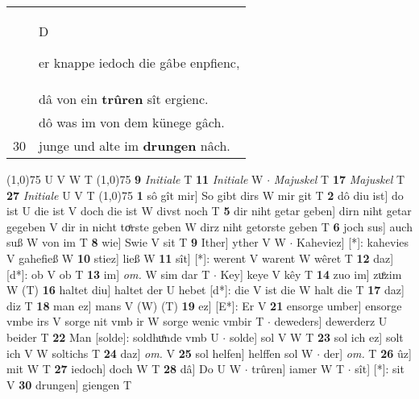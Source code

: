 \documentclass[8pt,a4paper,notitlepage]{article}
\begin{document}
\begin{table}[ht]
\begin{minipage}[t]{0.5\linewidth}
\begin{tabular}{rl}
 & \begin{large}D\end{large}er knappe iedoch die gâbe enpfienc,\\ 
 & dâ von ein \textbf{trûren} sît ergienc.\\ 
 & dô was im von dem künege gâch.\\ 
30 & junge und alte im \textbf{drungen} nâch.\\ 
\end{tabular}
\scriptsize
\line(1,0){75} \newline
U V W T \newline
\line(1,0){75} \newline
\textbf{9} \textit{Initiale} T  \textbf{11} \textit{Initiale} W   $\cdot$ \textit{Majuskel} T  \textbf{17} \textit{Majuskel} T  \textbf{27} \textit{Initiale} U V T  \newline
\line(1,0){75} \newline
\textbf{1} sô gît mir] So gibt dirs W mir git T \textbf{2} dô diu ist] do ist U die ist V doch die ist W divst noch T \textbf{5} dir niht getar geben] dirn niht getar gegeben V dir in nicht toͤrste geben W dirz niht getorste geben T \textbf{6} joch sus] auch suß W von im T \textbf{8} wie] Swie V sit T \textbf{9} Ither] yther V W  $\cdot$ Kaheviez] [*]: kahevies V gahefieß W \textbf{10} stiez] ließ W \textbf{11} sît] [*]: werent V warent W wêret T \textbf{12} daz] [d*]: ob V ob T \textbf{13} im] \textit{om.} W sim dar T  $\cdot$ Key] keye V kêy T \textbf{14} zuo im] zuͦzim W (T) \textbf{16} haltet diu] haltet der U hebet [d*]: die V ist die W halt die T \textbf{17} daz] diz T \textbf{18} man ez] mans V (W) (T) \textbf{19} ez] [E*]: Er V \textbf{21} ensorge umber] ensorge vmbe irs V sorge nit vmb ir W sorge wenic vmbir T  $\cdot$ deweders] dewerderz U beider T \textbf{22} Man [solde]: soldhuͦnde vmb U  $\cdot$ solde] sol V W T \textbf{23} sol ich ez] solt ich V W soltichs T \textbf{24} daz] \textit{om.} V \textbf{25} sol helfen] helffen sol W  $\cdot$ der] \textit{om.} T \textbf{26} ûz] mit W T \textbf{27} iedoch] doch W T \textbf{28} dâ] Do U W  $\cdot$ trûren] iamer W T  $\cdot$ sît] [*]: sit V \textbf{30} drungen] giengen T \newline
\end{minipage}
\end{table}
\end{document}

